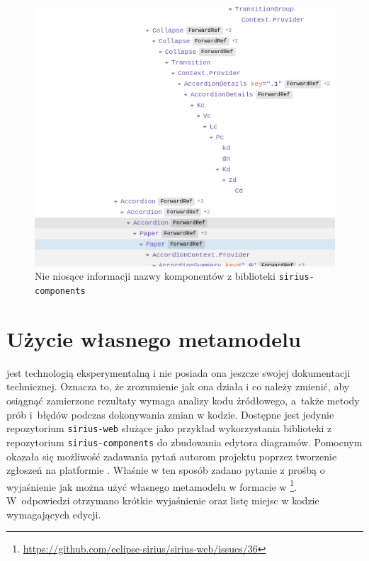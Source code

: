 \begin{figure}[!ht]
  \centering

  \includegraphics[width=0.7\linewidth]{./images/sirius-web-minified-component-names.png}
  \caption{Nie niosące informacji nazwy komponentów z biblioteki
    \texttt{sirius-components}}\label{rys:sirius-web-minified-component-names}
\end{figure}

\section{Użycie własnego metamodelu}

\SiriusWeb{} jest technologią eksperymentalną i nie posiada ona jeszcze
swojej dokumentacji technicznej. Oznacza to, że zrozumienie jak ona działa i co
należy zmienić, aby osiągnąć zamierzone rezultaty wymaga analizy kodu
źródłowego, a~także metody prób i~błędów podczas
dokonywania zmian w
kodzie. Dostępne jest jedynie repozytorium \texttt{sirius-web} służące jako
przykład wykorzystania biblioteki z repozytorium \texttt{sirius-components}
do zbudowania edytora diagramów.
Pomocnym okazała się możliwość zadawania pytań autorom projektu poprzez
tworzenie zgłoszeń na platformie \GitHub{}. Właśnie w ten sposób zadano
pytanie z prośbą o wyjaśnienie jak można użyć własnego metamodelu w formacie
\Ecore{} w
\SiriusWeb{}\footnote{
	\url{https://github.com/eclipse-sirius/sirius-web/issues/36}
}. W~odpowiedzi otrzymano krótkie wyjaśnienie oraz listę miejsc w kodzie
wymagających edycji.

